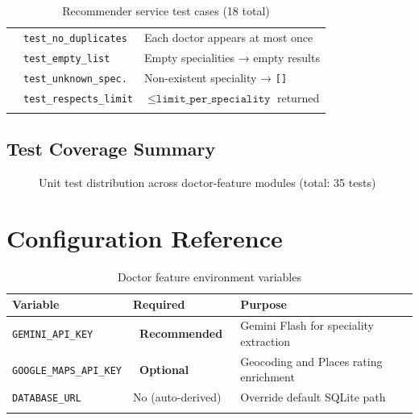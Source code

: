 \documentclass[12pt, a4paper]{article}
\newcommand{\envvar}[1]{\texttt{\color{warning}#1}}
\newcommand{\badge}[2]{\colorbox{#1}{\color{white}\small\textbf{\ #2\ }}}
\begin{document}
\begin{longtable}{p{3.8cm} p{3cm} p{6.5cm}}
    & \texttt{test\_no\_duplicates}       & Each doctor appears at most once \\
    & \texttt{test\_empty\_list}          & Empty specialities → empty results \\
    & \texttt{test\_unknown\_spec.}       & Non-existent speciality → \texttt{[]} \\
    & \texttt{test\_respects\_limit}      & $\leq \texttt{limit\_per\_speciality}$ returned \\
  \bottomrule
  \caption{Recommender service test cases (18 total)}
  \label{tab:recommender_tests}
\end{longtable}

\subsection{Test Coverage Summary}

\begin{figure}[H]
  \centering
  \caption{Unit test distribution across doctor-feature modules (total: 35 tests)}
  \label{fig:test_bar}
\end{figure}

\section{Configuration Reference}

\begin{longtable}{p{5cm} p{3cm} p{5.5cm}}
  \toprule
  \textbf{Variable} & \textbf{Required} & \textbf{Purpose} \\
  \midrule
  \envvar{GEMINI\_API\_KEY}      & \badge{warning}{Recommended} & Gemini Flash for speciality extraction \\[3pt]
  \envvar{GOOGLE\_MAPS\_API\_KEY}& \badge{success}{Optional} & Geocoding and Places rating enrichment \\[3pt]
  \envvar{DATABASE\_URL}         & No (auto-derived) & Override default SQLite path \\
  \bottomrule
  \caption{Doctor feature environment variables}
  \label{tab:config}
\end{longtable}
\end{document}
